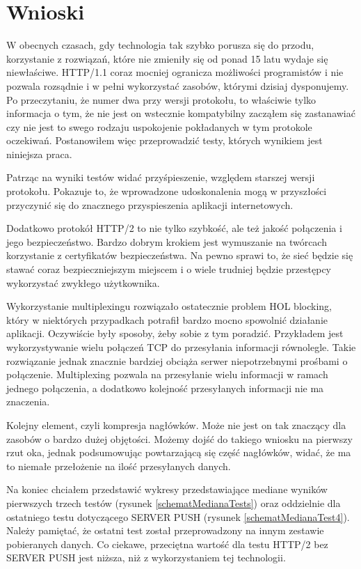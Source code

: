 \documentclass[a4paper,12pt,twoside,openany]{report}
\begin{document}
\chapter{Wnioski}


W obecnych czasach, gdy technologia tak szybko porusza się do przodu, korzystanie z rozwiązań, które nie zmieniły się od ponad 15 latu wydaje się niewłaściwe.
HTTP/1.1 coraz mocniej ogranicza możliwości programistów i nie pozwala rozsądnie i w pełni wykorzystać zasobów, którymi dzisiaj dysponujemy.
Po przeczytaniu, że numer dwa przy wersji protokołu, to właściwie tylko informacja o tym, że nie jest on wstecznie kompatybilny zacząłem się zastanawiać czy nie jest to swego rodzaju uspokojenie pokładanych w tym protokole oczekiwań.
Postanowiłem więc przeprowadzić testy, których wynikiem jest niniejsza praca.

Patrząc na wyniki testów widać przyśpieszenie, względem starszej wersji protokołu.
Pokazuje to, że wprowadzone udoskonalenia mogą w przyszłości przyczynić się do znacznego przyspieszenia aplikacji internetowych.

Dodatkowo protokół HTTP/2 to nie tylko szybkość, ale też jakość połączenia i jego bezpieczeństwo.
Bardzo dobrym krokiem jest wymuszanie na twórcach korzystanie z certyfikatów bezpieczeństwa.
Na pewno sprawi to, że sieć będzie się stawać coraz bezpieczniejszym miejscem i o wiele trudniej będzie przestępcy wykorzystać zwykłego użytkownika.

Wykorzystanie multiplexingu rozwiązało ostatecznie problem HOL blocking, który w niektórych przypadkach potrafił bardzo mocno spowolnić działanie aplikacji. 
Oczywiście były sposoby, żeby sobie z tym poradzić.
Przykładem jest wykorzystywanie wielu połączeń TCP do przesyłania informacji równolegle.
Takie rozwiązanie jednak znacznie bardziej obciąża serwer niepotrzebnymi prośbami o połączenie.
Multiplexing pozwala na przesyłanie wielu informacji w ramach jednego połączenia, a dodatkowo kolejność przesyłanych informacji nie ma znaczenia.

Kolejny element, czyli kompresja nagłówków.
Może nie jest on tak znaczący dla zasobów o bardzo dużej objętości.
Możemy dojść do takiego wniosku na pierwszy rzut oka, jednak podsumowując powtarzającą się część nagłówków, widać, że ma to niemałe przełożenie na ilość przesyłanych danych.

Na koniec chciałem przedstawić wykresy przedstawiające  mediane wyników pierwszych trzech testów (rysunek \ref{schematMedianaTests}) oraz oddzielnie dla ostatniego testu dotyczącego SERVER PUSH (rysunek \ref{schematMedianaTest4}).
Należy pamiętać, że ostatni test został przeprowadzony na innym zestawie pobieranych danych.
Co ciekawe, przeciętna wartość dla testu HTTP/2 bez SERVER PUSH jest niższa, niż z wykorzystaniem tej technologii.
\end{document}
